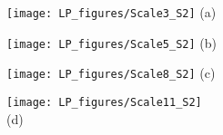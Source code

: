 \documentclass[]{article}
\begin{document}
\centering
\begin{minipage}{0.2\textwidth}
\centering
\texttt{[image: LP\_figures/Scale3\_S2]}
(a)
\end{minipage}
\begin{minipage}{0.2\textwidth}
\centering
\texttt{[image: LP\_figures/Scale5\_S2]}
(b)
\end{minipage}
\begin{minipage}{0.2\textwidth}
\centering
\texttt{[image: LP\_figures/Scale8\_S2]}
(c)
\end{minipage}
\begin{minipage}{0.2\textwidth}
\centering
\texttt{[image: LP\_figures/Scale11\_S2]}\\
(d)
\end{minipage}
\end{document}
